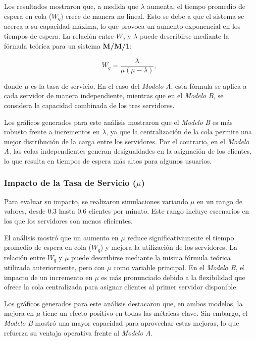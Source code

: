 \documentclass[a4paper,12pt]{article}
\begin{document}
Los resultados mostraron que, a medida que \( \lambda \) aumenta, el tiempo promedio de espera en cola (\( W_q \)) crece de manera no lineal. Esto se debe a que el sistema se acerca a su capacidad máxima, lo que provoca un aumento exponencial en los tiempos de espera. La relación entre \( W_q \) y \( \lambda \) puede describirse mediante la fórmula teórica para un sistema \textbf{M/M/1}:

\[\
W_q = \frac{\lambda}{\mu (\mu - \lambda)},
\]

donde \( \mu \) es la tasa de servicio. En el caso del \textit{Modelo A}, esta fórmula se aplica a cada servidor de manera independiente, mientras que en el \textit{Modelo B}, se considera la capacidad combinada de los tres servidores.

Los gráficos generados para este análisis mostraron que el \textit{Modelo B} es más robusto frente a incrementos en \( \lambda \), ya que la centralización de la cola permite una mejor distribución de la carga entre los servidores. Por el contrario, en el \textit{Modelo A}, las colas independientes generan desigualdades en la asignación de los clientes, lo que resulta en tiempos de espera más altos para algunos usuarios.

\subsubsection{Impacto de la Tasa de Servicio (\( \mu \))}
Para evaluar su impacto, se realizaron simulaciones variando \( \mu \) en un rango de valores, desde 0.3 hasta 0.6 clientes por minuto. Este rango incluye escenarios en los que los servidores son menos eficientes. 

El análisis mostró que un aumento en \( \mu \) reduce significativamente el tiempo promedio de espera en cola (\( W_q \)) y mejora la utilización de los servidores. La relación entre \( W_q \) y \( \mu \) puede describirse mediante la misma fórmula teórica utilizada anteriormente, pero con \( \mu \) como variable principal. En el \textit{Modelo B}, el impacto de un incremento en \( \mu \) es más pronunciado debido a la flexibilidad que ofrece la cola centralizada para asignar clientes al primer servidor disponible.

Los gráficos generados para este análisis destacaron que, en ambos modelos, la mejora en \( \mu \) tiene un efecto positivo en todas las métricas clave. Sin embargo, el \textit{Modelo B} mostró una mayor capacidad para aprovechar estas mejoras, lo que refuerza su ventaja operativa frente al \textit{Modelo A}.
\end{document}

